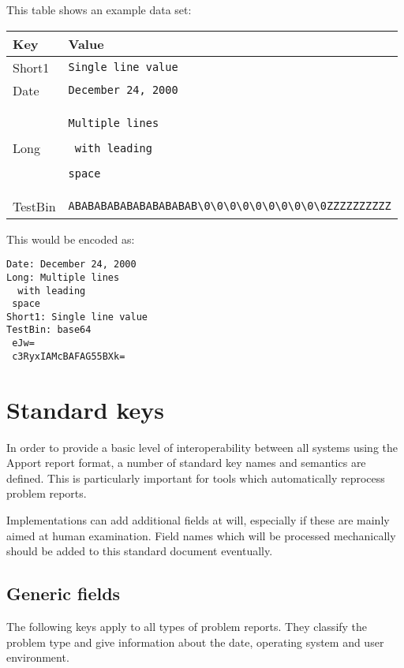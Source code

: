\documentclass[DIV12,halfparskip]{scrartcl}
\begin{document}
This table shows an example data set:

\begin{tabular}{lp{10cm}}\toprule
\textbf{Key} & \textbf{Value}\\
\midrule
Short1 & \verb!Single line value!\\
Date & \verb!December 24, 2000!\\
Long & \verb!Multiple lines!\par\verb! with leading!\par\verb!space!\\
TestBin & \verb!ABABABABABABABABABAB\0\0\0\0\0\0\0\0\0\0ZZZZZZZZZZ!\\
\bottomrule
\end{tabular}

This would be encoded as:

\begin{verbatim}
Date: December 24, 2000
Long: Multiple lines
  with leading
 space
Short1: Single line value
TestBin: base64
 eJw=
 c3RyxIAMcBAFAG55BXk=
\end{verbatim}

\section{Standard keys}

In order to provide a basic level of interoperability between all systems using
the Apport report format, a number of standard key names and semantics are
defined. This is particularly important for tools which automatically reprocess
problem reports.

Implementations can add additional fields at will, especially if these are
mainly aimed at human examination. Field names which will be processed
mechanically should be added to this standard document eventually.

\subsection{Generic fields}

The following keys apply to all types of problem reports. They classify the
problem type and give information about the date, operating system and user
environment.
\end{document}
